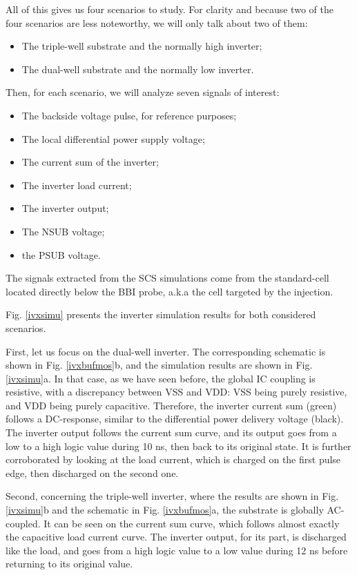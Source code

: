 	All of this gives us four scenarios	 to study.
	For clarity and because two of the four scenarios are less noteworthy, we will only talk about two of them:
	\begin{itemize}
		\item The triple-well substrate and the normally high inverter;
		\item The dual-well substrate and the normally low inverter.
	\end{itemize}
	Then, for each scenario, we will analyze seven signals of interest:
	\begin{itemize}
		\item The backside voltage pulse, for reference purposes;
		\item The local differential power supply voltage;
		\item The current sum of the inverter;
		\item The inverter load current;
		\item The inverter output;
		\item The NSUB voltage;
		\item the PSUB voltage.
	\end{itemize}
	The signals extracted from the SCS simulations come from the standard-cell located directly below the BBI probe, a.k.a the cell targeted by the injection.
	
	Fig. \ref{ivxsimu} presents the inverter simulation results for both considered scenarios.

	First, let us focus on the dual-well inverter.
	The corresponding schematic is shown in Fig. \ref{ivxbufmos}b, and the simulation results are shown in Fig. \ref{ivxsimu}a.
	In that case, as we have seen before, the global IC coupling is resistive, with a discrepancy between VSS and VDD: VSS being purely resistive, and VDD being purely capacitive.
	Therefore, the inverter current sum (green) follows a DC-response, similar to the differential power delivery voltage (black).
	The inverter output follows the current sum curve, and its output goes from a low to a high logic value during 10 ns, then back to its original state.
	It is further corroborated by looking at the load current, which is charged on the first pulse edge, then discharged on the second one.

	Second, concerning the triple-well inverter, where the results are shown in Fig. \ref{ivxsimu}b and the schematic in Fig. \ref{ivxbufmos}a, the substrate is globally AC-coupled.
	It can be seen on the current sum curve, which follows almost exactly the capacitive load current curve.
	The inverter output, for its part, is discharged like the load, and goes from a high logic value to a low value during 12 ns before returning to its original value.

